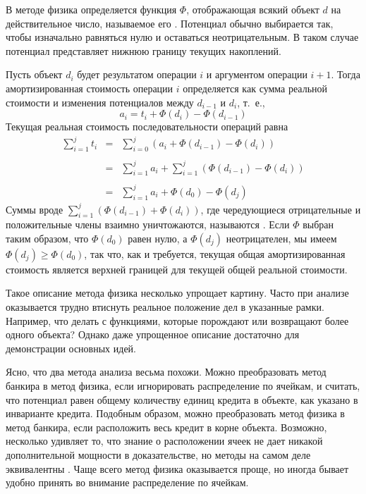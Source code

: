 В методе физика определяется функция $\Phi$, отображающая всякий
объект $d$ на действительное число, называемое его
.  Потенциал обычно выбирается так, чтобы
изначально равняться нулю и оставаться неотрицательным. В таком случае
потенциал представляет нижнюю границу текущих накоплений.

Пусть объект $d_i$ будет результатом операции $i$ и аргументом
операции $i+1$. Тогда амортизированная стоимость операции $i$
определяется как сумма реальной стоимости и изменения потенциалов между
$d_{i-1}$ и $d_i$, т.~е.,
$$
a_i = t_i + \Phi(d_i) - \Phi(d_{i-1})
$$
Текущая реальная стоимость последовательности операций равна
$$
\begin{array}{rcl}
\sum_{i=1}^j t_i & = & \sum_{i=0}^j (a_i + \Phi(d_{i-1}) - \Phi(d_i))\\
\\
  & = & \sum_{i=1}^j a_i + \sum_{i=1}^j (\Phi(d_{i-1}) - \Phi(d_i)) \\
\\
  & = & \sum_{i=1}^j a_i + \Phi(d_0) - \Phi(d_j)
\end{array}
$$
Суммы вроде $\sum_{i=1}^j (\Phi(d_{i-1}) + \Phi(d_i))$, где
чередующиеся отрицательные и положительные члены взаимно уничтожаются,
называются . Если $\Phi$ выбран таким образом, что
$\Phi(d_0)$ равен нулю, а $\Phi(d_j)$ неотрицателен, мы имеем
$\Phi(d_j) \ge \Phi(d_0)$, так что, как и требуется, текущая общая
амортизированная стоимость является верхней границей для текущей общей
реальной стоимости.

\begin{remark}
  Такое описание метода физика несколько упрощает
  картину. Часто при анализе оказывается трудно втиснуть реальное
  положение дел в указанные рамки. Например, что делать с функциями,
  которые порождают или возвращают более одного объекта? Однако даже
  упрощенное описание достаточно для демонстрации основных идей.
\end{remark}

Ясно, что два метода анализа весьма похожи. Можно преобразовать метод
банкира в метод физика, если игнорировать распределение по ячейкам, и
считать, что потенциал равен общему количеству единиц кредита в
объекте, как указано в инварианте кредита. Подобным образом, можно
преобразовать метод физика в метод банкира, если расположить весь
кредит в корне объекта. Возможно, несколько удивляет то, что знание о
расположении ячеек не дает никакой дополнительной мощности в
доказательстве, но методы на самом деле эквивалентны \cite{Tarjan1985,
  Schoenmakers1992}. Чаще всего метод физика оказывается проще, но
иногда бывает удобно принять во внимание распределение по ячейкам.

